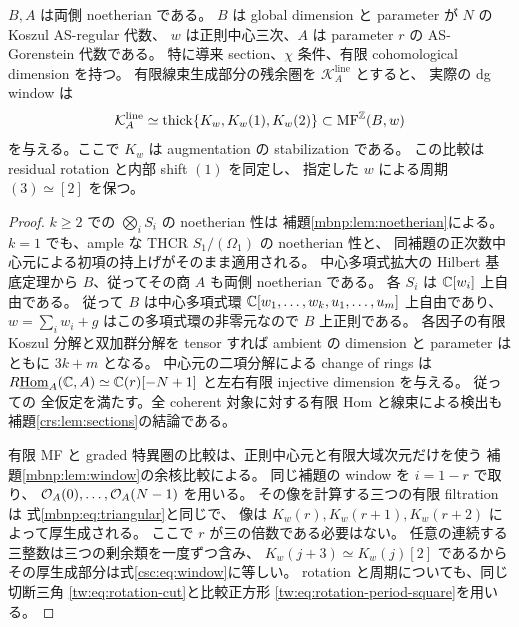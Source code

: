 \begin{lemma}
\label{csc:lem:algebra-window}
$B,A$ は両側 noetherian である。
$B$ は global dimension と parameter が $N$ の Koszul AS-regular 代数、
$w$ は正則中心三次、$A$ は parameter $r$ の AS-Gorenstein 代数である。
特に導来 section、$\chi$ 条件、有限 cohomological dimension を持つ。
有限線束生成部分の残余圏を $\mathcal K_A^{\mathrm{line}}$ とすると、
実際の dg window は
\begin{equation}\label{csc:eq:window}
 \mathcal K_A^{\mathrm{line}}
 \simeq\operatorname{thick}\{K_w,K_w(1),K_w(2)\}
       \subset\operatorname{MF}^{\mathbb Z}(B,w)
\end{equation}
を与える。ここで $K_w$ は augmentation の stabilization である。
この比較は residual rotation と内部 shift $(1)$ を同定し、
指定した $w$ による周期 $(3)\simeq[2]$ を保つ。
\end{lemma}
\begin{proof}
$k\geq2$ での $\bigotimes_iS_i$ の noetherian 性は
補題\ref{mbnp:lem:noetherian}による。
$k=1$ でも、ample な THCR $S_1/(\Omega_1)$ の noetherian 性と、
同補題の正次数中心元による初項の持上げがそのまま適用される。
中心多項式拡大の Hilbert 基底定理から $B$、従ってその商 $A$ も両側 noetherian である。
各 $S_i$ は $\mathbb C[w_i]$ 上自由である。
従って $B$ は中心多項式環
$\mathbb C[w_1,\ldots,w_k,u_1,\ldots,u_m]$ 上自由であり、
$w=\sum_iw_i+g$ はこの多項式環の非零元なので $B$ 上正則である。
各因子の有限 Koszul 分解と双加群分解を tensor すれば
ambient の dimension と parameter はともに $3k+m$ となる。
中心元の二項分解による change of rings は
$R\underline{\operatorname{Hom}}_A(\mathbb C,A)\simeq\mathbb C(r)[-N+1]$
と左右有限 injective dimension を与える。
従って\cite[Proposition~4.18, Lemmas~6.1--6.2, Theorem~6.4]{LP-BS}の
全仮定を満たす。全 coherent 対象に対する有限 Hom と線束による検出も
補題\ref{crs:lem:sections}の結論である。

有限 MF と graded 特異圏の比較は、正則中心元と有限大域次元だけを使う
補題\ref{mbnp:lem:window}の余核比較による。
同じ補題の window を $i=1-r$ で取り、
$\mathcal O_A(0),\ldots,\mathcal O_A(N-1)$ を用いる。
その像を計算する三つの有限 filtration は
式\eqref{mbnp:eq:triangular}と同じで、
像は $K_w(r),K_w(r+1),K_w(r+2)$ によって厚生成される。
ここで $r$ が三の倍数である必要はない。
任意の連続する三整数は三つの剰余類を一度ずつ含み、
$K_w(j+3)\simeq K_w(j)[2]$ であるから
その厚生成部分は式\eqref{csc:eq:window}に等しい。
rotation と周期についても、同じ切断三角
\eqref{tw:eq:rotation-cut}と比較正方形
\eqref{tw:eq:rotation-period-square}を用いる。
\end{proof}

